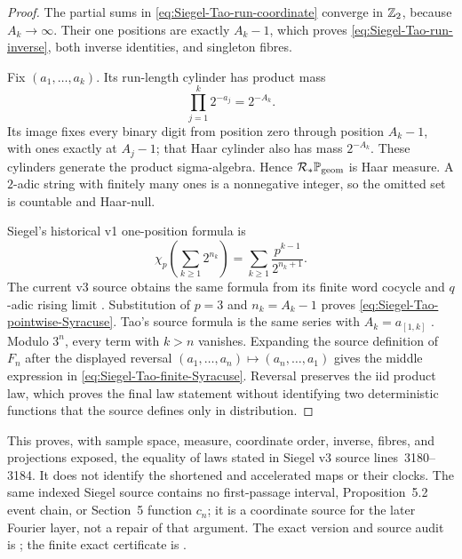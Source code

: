 \begin{proof}
The partial sums in \eqref{eq:Siegel-Tao-run-coordinate} converge in
\(\mathbb{Z}_{2}\), because \(A_k\to\infty\).  Their one positions are exactly
\(A_k-1\), which proves \eqref{eq:Siegel-Tao-run-inverse}, both inverse
identities, and singleton fibres.

Fix \((a_1,\ldots,a_k)\).  Its run-length cylinder has product mass
\[
 \prod_{j=1}^k2^{-a_j}=2^{-A_k}.
\]
Its image fixes every binary digit from position zero through position
\(A_k-1\), with ones exactly at \(A_j-1\); that Haar cylinder also has mass
\(2^{-A_k}\).  These cylinders generate the product sigma-algebra.  Hence
\(\mathcal R_*\mathbb P_{\rm geom}\) is Haar measure.  A $2$-adic string
with finitely many ones is a nonnegative integer, so the omitted set is
countable and Haar-null.

Siegel's historical v1 one-position formula is
\[
 \chi_p\!\left(\sum_{k\geq1}2^{n_k}\right)
 =\sum_{k\geq1}\frac{p^{k-1}}{2^{n_k+1}}.
\]
The current v3 source obtains the same formula from its finite word cocycle
and $q$-adic rising limit
\cite[historical v1 source lines 405--568]{Siegel2007v1}
\cite[current v3 source lines 1851--2000]{Siegel2007v3}.
Substitution of \(p=3\) and \(n_k=A_k-1\) proves
\eqref{eq:Siegel-Tao-pointwise-Syracuse}.  Tao's source formula is the same
series with \(A_k=a_{[1,k]}\)
\cite[source lines 384--393, 436--440]{Tao2026v7}.  Modulo \(3^n\), every
term with \(k>n\) vanishes.  Expanding the source definition of \(F_n\)
after the displayed reversal \((a_1,\ldots,a_n)\mapsto(a_n,\ldots,a_1)\)
gives the middle expression in
\eqref{eq:Siegel-Tao-finite-Syracuse}.  Reversal preserves the iid product
law, which proves the final law statement without identifying two
deterministic functions that the source defines only in distribution.
\end{proof}

This proves, with sample space, measure, coordinate order, inverse, fibres,
and projections exposed, the equality of laws stated in Siegel v3 source
lines~3180--3184.  It does not identify the shortened and accelerated maps or
their clocks.  The same indexed Siegel source contains no first-passage
interval, Proposition~5.2 event chain, or Section~5 function \(c_n\); it is a
coordinate source for the later Fourier layer, not a repair of that argument.
The exact version and source audit is
; the finite exact
certificate is
.

